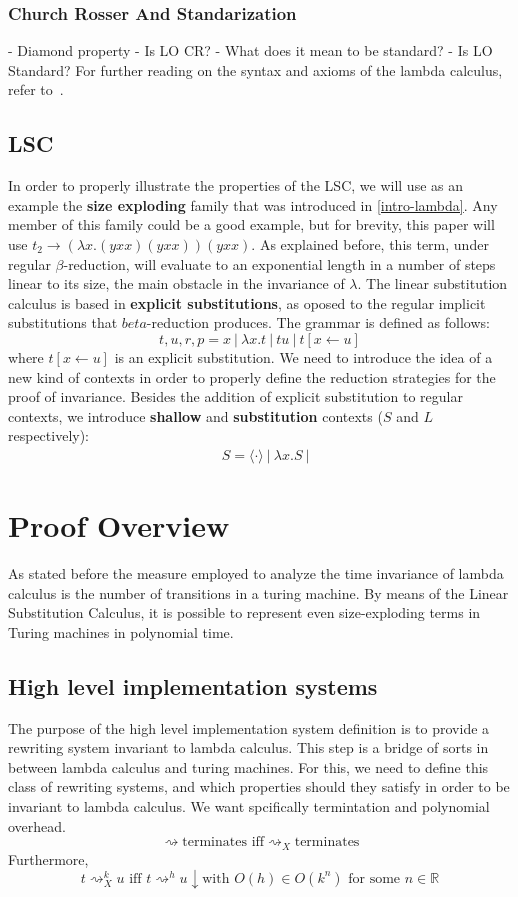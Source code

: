 \documentclass[12pt]{article}
\begin{document}
\subsubsection{Church Rosser And Standarization}
- Diamond property - Is LO CR?
- What does it mean to be standard? - Is LO Standard?
For further reading on the syntax and axioms of the lambda calculus, refer to~\cite{barendregt1984lambda}.
\subsection{LSC}
In order to properly illustrate the properties of the LSC, we will use as an example the \textbf{size exploding} family that was introduced in \ref{intro-lambda}. Any member of this family could be a good example, but for brevity, this paper will use $t_{2} \rightarrow (\lambda x. (yxx)(yxx))(yxx)$. As explained before, this term, under regular $\beta$-reduction, will evaluate to an exponential length in a number of steps linear to its size, the main obstacle in the invariance of $\lambda$.
The linear substitution calculus is based in \textbf{explicit substitutions}, as oposed to the regular implicit substitutions that $beta$-reduction produces. The grammar is defined as follows:
\begin{equation}
  t, u, r, p = x \ | \ \lambda x.t \ | \ tu \ | \ t[x \leftarrow u]
\end{equation}
where $t[x \leftarrow u]$ is an explicit substitution.
We need to introduce the idea of a new kind of contexts in order to properly define the reduction strategies for the proof of invariance. Besides the addition of explicit substitution to regular contexts, we introduce \textbf{shallow} and \textbf{substitution} contexts ($S$ and $L$ respectively):
\begin{equation}
  \begin{split}
    &S = \langle \cdot \rangle \ | \ \lambda x.S \ |
  \end{split}
\end{equation}
\section{Proof Overview}
As stated before the measure employed to analyze the time invariance of lambda calculus is the number of transitions in a turing machine. By means of the Linear Substitution Calculus, it is possible to represent even size-exploding terms in Turing machines in polynomial time.
\subsection{High level implementation systems}
The purpose of the high level implementation system definition is to provide a rewriting system invariant to lambda calculus. This step is a bridge of sorts in between lambda calculus and turing machines. For this, we need to define this class of rewriting systems, and which properties should they satisfy in order to be invariant to lambda calculus. We want spcifically termintation and polynomial overhead.
$$\rightsquigarrow \text{terminates iff} {\rightsquigarrow}_{X} \text{terminates}$$
Furthermore,
$$t {\rightsquigarrow}_{X}^k u \text{ iff } t {\rightsquigarrow}^h u\downarrow \text{with } O(h) \in O(k^n) \text{ for some } n \in \mathbb{R} $$
\end{document}
